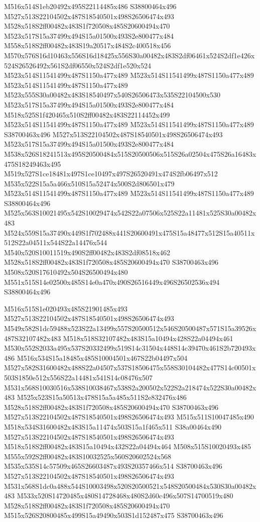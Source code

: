 \documentclass{article}
\begin{document}
\begin{multicols}{2}
M516x514S1eb20492x495S22114485x486 S38800464x496 M527x513S22104502x487S18540501x498S26506474x493 M528x518S2ff00482x483S1f720508x485S20600494x470 M523x517S15a37499x494S15a01500x493S2e800477x484 M558x518S2ff00482x483S19a20517x484S2c400518x456 M570x576S16d10463x556S16d18425x556S30a00482x483S2df06461x524S2df1e426x524S26526492x561S2df06550x524S2df1e520x524 M523x514S11541499x487S1150a477x489 M523x514S11541499x487S1150a477x489 M523x514S11541499x487S1150a477x489 M523x555S30a00482x483S18540497x540S26506473x535S22104500x530 M523x517S15a37499x494S15a01500x493S2e800477x484 M518x525S1f420465x510S2ff00482x483S22114452x499 M523x514S11541499x487S1150a477x489 M523x514S11541499x487S1150a477x489 S38700463x496 M527x513S22104502x487S18540501x498S26506474x493 M523x517S15a37499x494S15a01500x493S2e800477x484 M538x526S18241513x495S20500484x515S20500506x515S26a02504x475S26a16483x475S18249463x495 M519x527S1ce18481x497S1ce10497x497S26520491x474S2fb06497x512 M535x522S15a5a466x510S15a52474x500S2d806501x479 M523x514S11541499x487S1150a477x489 M523x514S11541499x487S1150a477x489 S38800464x496 M525x563S10021495x542S10029474x542S22a07506x525S22a11481x525S30a00482x483 M524x559S15a37490x449S1f702488x441S20600491x475S15a48477x512S15a40511x512S22a04511x544S22a14476x544 M540x520S10011519x490S2ff00482x483S2df08518x462 M528x518S2ff00482x483S1f720508x485S20600494x470 S38700463x496 M508x520S17610492x504S26500494x480 M551x515S14e02500x485S14e0a470x490S26516449x496S26502536x494 S38800464x496

M516x515S1e020493x485S21901485x493 M527x513S22104502x487S18540501x498S26506474x493 M549x582S1dc59488x523S22a13499x557S20500512x546S20500487x571S15a39526x487S32107482x483 M518x518S32107482x483S15a10494x428S22a04494x461 M530x552S2033a495x537S20332499x519S14c31504x448S14c39470x461S2b720493x486 M516x534S15a18485x485S10004501x467S22b04497x504 M527x582S31600482x488S22a04507x537S18506475x558S30104482x477S14c00501x503S1850e512x556S22a14481x541S14c08476x507 M531x568S10030516x538S10038467x538S2a200502x522S2a218474x522S30a00482x483 M525x523S15a50513x478S15a5a485x511S2e832476x486 M528x518S2ff00482x483S1f720508x485S20600494x470 S38700463x496 M527x513S22104502x487S18540501x498S26506474x493 M515x511S10047485x490 M518x534S31600482x483S15a11474x503S15a1f465x511 S38a00464x490 M527x513S22104502x487S18540501x498S26506474x493 M518x518S2ff00482x483S15a10494x432S22a04494x464 M508x515S10020493x485 M555x592S2ff00482x483S10032525x560S20602524x568 M535x535S14c57509x465S26603487x493S20357466x514 S38700463x496 M527x513S22104502x487S18540501x498S26506474x493 M531x568S1dc0a488x544S10003498x520S20500521x548S20500484x530S30a00482x483 M533x520S14720485x480S14728468x480S2d60c496x507S14700519x480 M528x518S2ff00482x483S1f720508x485S20600494x470 M515x526S20800485x499S15a49490x503S1d152487x475 S38700463x496


\end{multicols}
\end{document}
